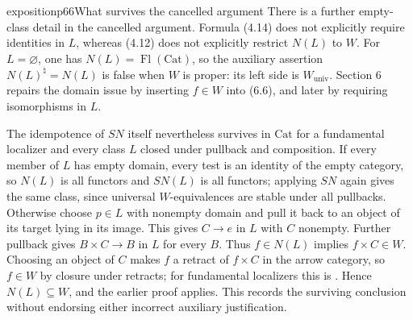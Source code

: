 \begin{dcomment}{exposition}{p66}{What survives the cancelled argument}
There is a further empty-class detail in the cancelled argument. Formula (4.14) does not explicitly require identities in $L$, whereas (4.12) does not explicitly restrict $N(L)$ to $W$. For $L=\varnothing$, one has $N(L)=\operatorname{Fl}(\mathrm{Cat})$, so the auxiliary assertion $N(L)^\natural=N(L)$ is false when $W$ is proper: its left side is $W_{\mathrm{univ}}$. Section 6 repairs the domain issue by inserting $f\in W$ into (6.6), and later by requiring isomorphisms in $L$.

The idempotence of $SN$ itself nevertheless survives in $\mathrm{Cat}$ for a fundamental localizer and every class $L$ closed under pullback and composition. If every member of $L$ has empty domain, every test is an identity of the empty category, so $N(L)$ is all functors and $SN(L)$ is all functors; applying $SN$ again gives the same class, since universal $W$-equivalences are stable under all pullbacks. Otherwise choose $p\in L$ with nonempty domain and pull it back to an object of its target lying in its image. This gives $C\to e$ in $L$ with $C$ nonempty. Further pullback gives $B\times C\to B$ in $L$ for every $B$. Thus $f\in N(L)$ implies $f\times C\in W$. Choosing an object of $C$ makes $f$ a retract of $f\times C$ in the arrow category, so $f\in W$ by closure under retracts; for fundamental localizers this is \citet[Proposition 4.2.4, p.~183]{Cisinski2006Prefaisceaux}. Hence $N(L)\subseteq W$, and the earlier proof applies. This records the surviving conclusion without endorsing either incorrect auxiliary justification.
\end{dcomment}

